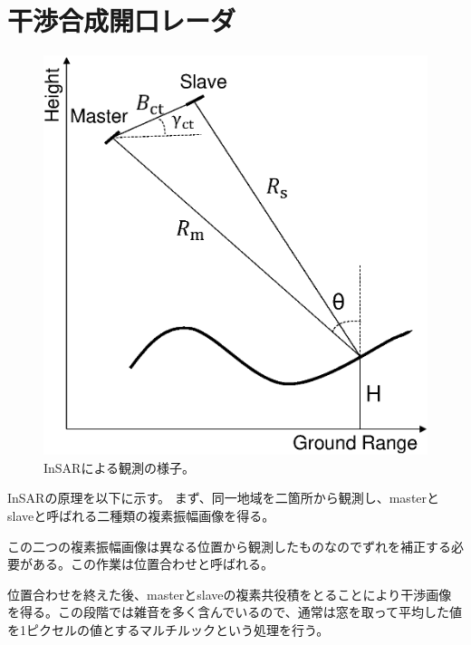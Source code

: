 \documentclass[a4j, twocolumn]{jsarticle}
\begin{document}
\section{干渉合成開口レーダ}
\begin{figure}[!t]
	\begin{center}
		\includegraphics[scale = 0.5,bb=0 0 345 359]{InSAR1.eps}
		\caption{InSARによる観測の様子。}
		\label{InSAR}
	\end{center}
\end{figure}
InSARの原理を以下に示す。
まず、同一地域を二箇所から観測し、masterとslaveと呼ばれる二種類の複素振幅画像を得る。

この二つの複素振幅画像は異なる位置から観測したものなのでずれを補正する必要がある。この作業は位置合わせと呼ばれる。

位置合わせを終えた後、masterとslaveの複素共役積をとることにより干渉画像を得る。この段階では雑音を多く含んでいるので、通常は窓を取って平均した値を1ピクセルの値とするマルチルックという処理を行う。
\end{document}

